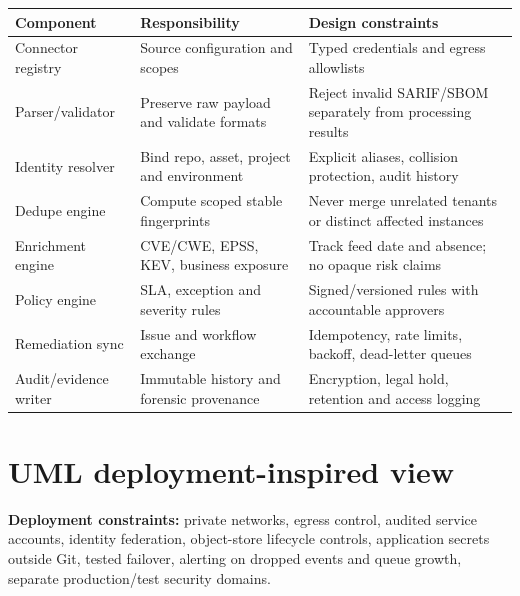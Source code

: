 \documentclass[11pt,oneside]{report}
\begin{document}
\noindent\begin{tabularx}{\textwidth}{P{0.23\textwidth}P{0.30\textwidth}Y}
\toprule Component & Responsibility & Design constraints\\\midrule
Connector registry & Source configuration and scopes & Typed credentials and egress allowlists\\
Parser/validator & Preserve raw payload and validate formats & Reject invalid SARIF/SBOM separately from processing results\\
Identity resolver & Bind repo, asset, project and environment & Explicit aliases, collision protection, audit history\\
Dedupe engine & Compute scoped stable fingerprints & Never merge unrelated tenants or distinct affected instances\\
Enrichment engine & CVE/CWE, EPSS, KEV, business exposure & Track feed date and absence; no opaque risk claims\\
Policy engine & SLA, exception and severity rules & Signed/versioned rules with accountable approvers\\
Remediation sync & Issue and workflow exchange & Idempotency, rate limits, backoff, dead-letter queues\\
Audit/evidence writer & Immutable history and forensic provenance & Encryption, legal hold, retention and access logging\\
\bottomrule
\end{tabularx}

\section{UML deployment-inspired view}
\begin{center}
\end{center}
\textbf{Deployment constraints:} private networks, egress control, audited service accounts, identity federation, object-store lifecycle controls, application secrets outside Git, tested failover, alerting on dropped events and queue growth, separate production/test security domains.
\end{document}
